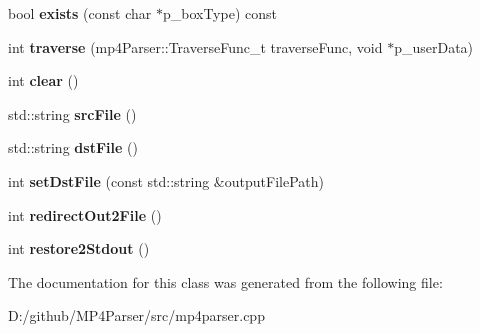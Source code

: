 \begin{DoxyCompactItemize}
bool {\bfseries exists} (const char $\ast$p\+\_\+box\+Type) const
\item 
\mbox{\label{classmp4_parser_1_1_m_p4_parser_impl_aa04ee319a879a322270a2c52cdf4b813}} 
int {\bfseries traverse} (mp4\+Parser\+::\+Traverse\+Func\+\_\+t traverse\+Func, void $\ast$p\+\_\+user\+Data)
\item 
\mbox{\label{classmp4_parser_1_1_m_p4_parser_impl_a7f4ff13eb8e07843580b4dc205fe53e5}} 
int {\bfseries clear} ()
\item 
\mbox{\label{classmp4_parser_1_1_m_p4_parser_impl_a14893e3ea92dfcfe5b5357a898d888f3}} 
std\+::string {\bfseries src\+File} ()
\item 
\mbox{\label{classmp4_parser_1_1_m_p4_parser_impl_a4e503fd395c8d7cd46c605e4a4b23584}} 
std\+::string {\bfseries dst\+File} ()
\item 
\mbox{\label{classmp4_parser_1_1_m_p4_parser_impl_a3840df626f2163013bf0e94c7aac2f14}} 
int {\bfseries set\+Dst\+File} (const std\+::string \&output\+File\+Path)
\item 
\mbox{\label{classmp4_parser_1_1_m_p4_parser_impl_a45c57a93171667ba2361ef95292d5b9b}} 
int {\bfseries redirect\+Out2\+File} ()
\item 
\mbox{\label{classmp4_parser_1_1_m_p4_parser_impl_aeed8ee718587393e3fc730cbe0f60ce7}} 
int {\bfseries restore2\+Stdout} ()
\end{DoxyCompactItemize}


The documentation for this class was generated from the following file\+:\begin{DoxyCompactItemize}
\item 
D\+:/github/\+M\+P4\+Parser/src/mp4parser.\+cpp\end{DoxyCompactItemize}
